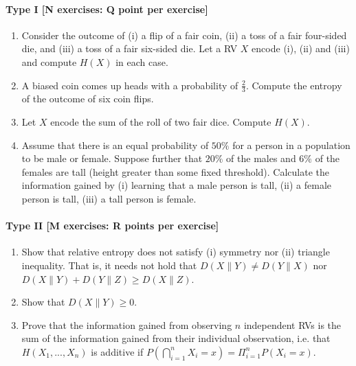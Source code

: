 \documentclass{article}
\begin{document}
\paragraph{Type I [N exercises: Q point per exercise]}
\begin{enumerate}
	\item Consider the outcome of (i) a flip of a fair coin, (ii) a toss of a fair four-sided die, and (iii) a toss of a fair six-sided die. Let a RV $X$ encode (i), (ii) and (iii) and compute $H(X)$ in each case.
	\item A biased coin comes up heads with a probability of $\frac{2}{3}$. Compute the entropy of the outcome of six coin flips.
	\item Let $X$ encode the sum of the roll of two fair dice. Compute $H(X)$.
	\item Assume that there is an equal probability of $50\%$ for a person in a population to be male or female. Suppose further that $20\%$ of the males and $6\%$ of the females are tall (height greater than some fixed threshold). Calculate the information gained by (i) learning that a male person is tall, (ii) a female person is tall, (iii) a tall person is female.
\end{enumerate}

\paragraph{Type II [M exercises: R points per exercise]}
\begin{enumerate}
	\item Show that relative entropy does not satisfy (i) symmetry nor (ii) triangle inequality. That is, it needs not hold that $D(X\parallel Y) \neq  D(Y \parallel X)$ nor $D(X\parallel Y) + D(Y\parallel Z) \geq D(X \parallel Z)$.
	\item Show that $D(X\parallel Y) \geq 0$.
	\item Prove that the information gained from observing $n$ independent RVs is the sum of the information gained from their individual observation, i.e. that  $H(X_1, ..., X_n)$ is additive if $P(\bigcap_{i = 1}^{n} X_i=x) = \Pi_{i = 1}^n P(X_i=x)$.
\end{enumerate}
\end{document}

